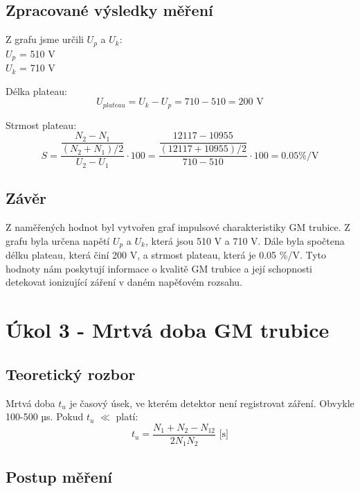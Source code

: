 \documentclass{protokol}
\begin{document}
    \subsection{Zpracované výsledky měření}

    Z grafu jsme určili $U_p$ a $U_k$:
    \\
    $U_p$ = 510 V\\
    $U_k$ = 710 V

    Délka plateau:
    \begin{equation}
        U_{plateau} = U_k - U_p = 710 - 510 = 200 \text{ V}
    \end{equation}

    Strmost plateau:
    \begin{equation}   
        S =  \dfrac{\dfrac{N_2-N_1}{(N_2+N_1)/2}}{U_2-U_1} \cdot 100 = \dfrac{\dfrac{12117-10955}{(12117+10955)/2}}{710-510} \cdot 100 = 0.05  \% / \text{V}
    \end{equation}
    
    \subsection{Závěr}
    Z naměřených hodnot byl vytvořen graf impulsové charakteristiky GM trubice. Z grafu byla určena napětí $U_p$ a $U_k$, která jsou 510 V a 710 V. Dále byla spočtena délku plateau, která činí 200 V, a strmost plateau, která je 0.05 \%/V. Tyto hodnoty nám poskytují informace o kvalitě GM trubice a její schopnosti detekovat ionizující záření v daném napěťovém rozsahu.

\pagebreak

\section{Úkol 3 - Mrtvá doba GM trubice}
    \subsection{Teoretický rozbor}

    Mrtvá doba $t_u$ je časový úsek, ve kterém detektor není registrovat záření. Obvykle 100-500 µs. Pokud $t_u$ $\ll$  platí:
    \begin{equation}   
        t_u =  \dfrac{N_1+N_2-N_{12}}{2N_1N_2}  \text{     [s]}
    \end{equation}

    \subsection{Postup měření}
\end{document}
